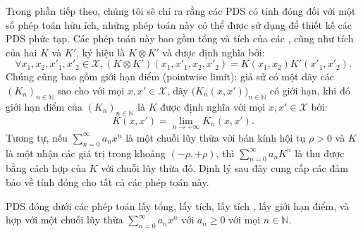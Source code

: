 Trong phần tiếp theo, chúng tôi sẽ chỉ ra rằng các  PDS có tính đóng
đối với một số phép toán hữu ích, những phép toán này có thể được sử dụng để
thiết kế các  PDS phức tạp. Các phép toán này bao gồm tổng và tích
của các , cũng như tích  của hai  $K$ và $K'$,
ký hiệu là $K \otimes K'$ và được định nghĩa bởi: \begin{equation}
  \forall x_1, x_2, x'_1, x'_2 \in \mathcal{X}, (K \otimes K')(x_1, x'_1, x_2,
  x'_2) = K(x_1, x_2)K'(x'_1, x'_2).
\end{equation} Chúng cũng bao gồm giới hạn điểm (pointwise limit): giả sử có
một dãy các  $(K_n)_{n \in \mathbb{N}}$ sao cho với mọi $x, x' \in
\mathcal{X}$, dãy $\bigl(K_n(x, x')\bigr)_{n \in \mathbb{N}}$ có giới hạn, khi
đó giới hạn điểm của $(K_n)_{n \in \mathbb{N}}$ là  $K$ được định
nghĩa với mọi $x, x' \in \mathcal{X}$ bởi: \begin{equation}
  K(x, x') = \lim_{n \to +\infty} K_n(x, x').
\end{equation} Tương tự, nếu $\sum_{n=0}^{\infty} a_n x^n$ là một chuỗi lũy
thừa với bán kính hội tụ $\rho > 0$ và $K$ là một  nhận các giá trị
trong khoảng $(-\rho, +\rho)$, thì $\sum_{n=0}^{\infty} a_n K^n$ là 
thu được bằng cách hợp của $K$ với chuỗi lũy thừa đó. Định lý
sau đây cung cấp các đảm bảo về tính đóng cho tất cả các phép toán này.

\begin{thm}
   PDS đóng dưới các phép toán lấy tổng, lấy tích, lấy tích
  , lấy giới hạn điểm, và hợp với một chuỗi lũy thừa
  $\sum_{n=0}^\infty a_nx^n$ với $a_n\ge 0$ với mọi $n\in\mathbb{N}$.
\end{thm}


